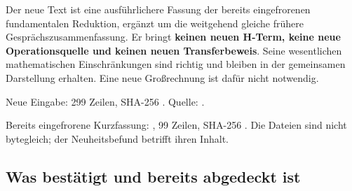 Der neue Text ist eine ausführlichere Fassung der bereits eingefrorenen
fundamentalen Reduktion, ergänzt um die weitgehend gleiche frühere
Gesprächszusammenfassung. Er bringt \textbf{keinen neuen H-Term, keine
neue Operationsquelle und keinen neuen Transferbeweis}. Seine
wesentlichen mathematischen Einschränkungen sind richtig und bleiben in
der gemeinsamen Darstellung erhalten. Eine neue Großrechnung ist dafür
nicht notwendig.

Neue Eingabe: 299 Zeilen, SHA-256
.
Quelle:
.

Bereits eingefrorene Kurzfassung:
,
99 Zeilen, SHA-256
.
Die Dateien sind nicht bytegleich; der Neuheitsbefund betrifft ihren
Inhalt.

\subsection{Was bestätigt und bereits abgedeckt
ist}\label{was-bestuxe4tigt-und-bereits-abgedeckt-ist}


